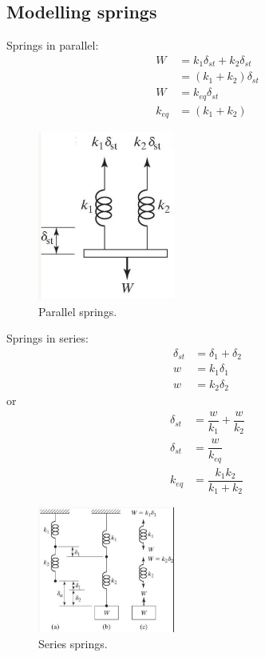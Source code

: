 \subsection{Modelling springs}
Springs in parallel:
\begin{align}
    W      & = k_1 \delta_{st} + k_2 \delta_{st}  \\
           & = \left(k_1 + k_2 \right)\delta_{st} \\
    W      & = k_{eq} \delta_{st}                 \\
    k_{eq} & = \left(k_1 + k_2\right)
\end{align}
\begin{figure}[H]
    \centering
    \includegraphics[width = 0.4\textwidth]{./img/diagram16.jpg}
    \caption{Parallel springs.}
\end{figure}
Springs in series:
\begin{align}
    \delta_{st} & = \delta_1 + \delta_2 \\
    w           & = k_1 \delta_1        \\
    w           & = k_2 \delta_2
\end{align}
or
\begin{align}
    \delta_{st} & = \dfrac{w}{k_1} + \dfrac{w}{k_2} \\
    \delta_{st} & = \dfrac{w}{k_{eq}}               \\
    k_{eq}      & = \dfrac{k_1k_2}{k_1 + k_2}
\end{align}
\begin{figure}
    \centering
    \includegraphics[width = 0.4\textwidth]{./img/diagram17.jpg}
    \caption{Series springs.}
\end{figure}
